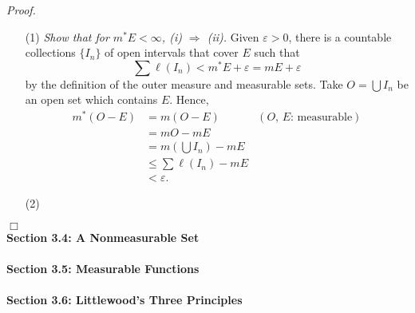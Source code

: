 \documentclass{article}
\begin{document}
\emph{Proof.}
\begin{enumerate}
\item[(1)]
  \emph{Show that for $m^{*}E < \infty$, (i) $\Rightarrow$ (ii).}
  Given $\varepsilon > 0$,
  there is a countable collections $\{ I_n \}$ of open intervals that cover $E$
  such that
  \[
    \sum \ell(I_n) < m^{*}E + \varepsilon = mE + \varepsilon
  \]
  by the definition of the outer measure and measurable sets.
  Take $O = \bigcup I_n$ be an open set which contains $E$.
  Hence,
  \begin{align*}
    m^{*}(O - E)
    &= m(O - E)
      &(\text{$O$, $E$: measurable}) \\
    &= mO - mE \\
    &= m\left( \bigcup I_n \right) - mE \\
    &\leq \sum \ell(I_n) - mE \\
    &< \varepsilon.
  \end{align*}

\item[(2)]

\end{enumerate}
$\Box$\\







\textbf{\large Section 3.4: A Nonmeasurable Set} \\\\






\textbf{\large Section 3.5: Measurable Functions} \\\\






\textbf{\large Section 3.6: Littlewood's Three Principles} \\\\



\end{document}
